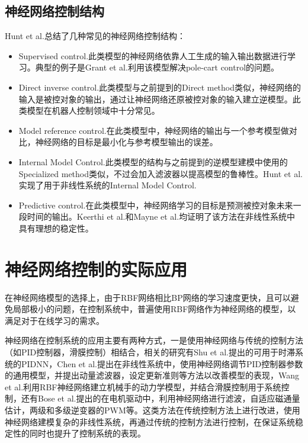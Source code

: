 \documentclass[12pt,onecolumn,letterpaper]{article}
\begin{document}
    \subsection{神经网络控制结构}
    Hunt et al.\cite{hunt1992neural}总结了几种常见的神经网络控制结构：
    \begin{itemize}
        \item Supervised control.此类模型的神经网络依靠人工生成的输入输出数据进行学习。典型的例子是Grant et al.\cite{grant1989neural}利用该模型解决pole-cart control的问题。
        \item Direct inverse control.此类模型与之前提到的Direct method类似，神经网络的输入是被控对象的输出，通过让神经网络还原被控对象的输入建立逆模型。此类模型在机器人控制领域中十分常见。
        \item Model reference control.在此类模型中，神经网络的输出与一个参考模型做对比，神经网络的目标是最小化与参考模型输出的误差。
        \item Internal Model Control.此类模型的结构与之前提到的逆模型建模中使用的Specialized method类似，不过会加入滤波器以提高模型的鲁棒性。Hunt et al.\cite{hunt1991neural}实现了用于非线性系统的Internal Model Control.
        \item Predictive control.在此类模型中，神经网络学习的目标是预测被控对象未来一段时间的输出。Keerthi et al.\cite{keerthi1986moving}和Mayne et al.\cite{mayne1988receding}均证明了该方法在非线性系统中具有理想的稳定性。
    \end{itemize}



    \section{神经网络控制的实际应用}
    在神经网络模型的选择上，由于RBF网络相比BP网络的学习速度更快，且可以避免局部极小的问题，在控制系统中，普遍使用RBF网络作为神经网络的模型，以满足对于在线学习的需求。

    神经网络在控制系统的应用主要有两种方式，一是使用神经网络与传统的控制方法（如PID控制器，滑膜控制）相结合，相关的研究有Shu et al.\cite{shu2000pid}提出的可用于时滞系统的PIDNN，Chen et al.\cite{chen2004applying}提出在非线性系统中，使用神经网络调节PID控制器参数的通用模型，并提出动量滤波器，设定更新准则等方法以改善模型的表现，Wang et al.\cite{wang2009neural}利用RBF神经网络建立机械手的动力学模型，并结合滑膜控制用于系统控制，还有Bose et al.\cite{bose2007neural}提出的在电机驱动中，利用神经网络进行滤波，自适应磁通量估计，两级和多级逆变器的PWM等。这类方法在传统控制方法上进行改进，使用神经网络建模复杂的非线性系统，再通过传统的控制方法进行控制，在保证系统稳定性的同时也提升了控制系统的表现。
\end{document}
